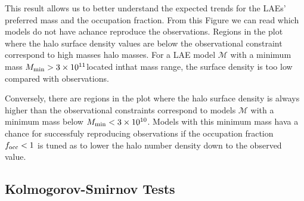 \documentclass[usenatbib]{mn2e}
\newcommand{\hMsun}{{\ifmmode{h^{-1}{\rm {M_{\odot}}}}\else{$h^{-1}{\rm{M_{\odot}}}$}\fi}}
\begin{document}
This result allows us to better understand the expected trends for the
LAEs' preferred mass and the occupation fraction.  From this Figure we
can read which models do not have achance reproduce the
observations. Regions in the plot where the halo surface density
values are below the observational constraint correspond to high
masses halo masses. For a LAE model ${\mathcal M}$ with a minimum mass
$M_{\rm   min}> 3 \times 10^{11}$\hMsun located inthat mass range, the
surface density is too low compared with observations.   

Conversely, there are regions in the plot where the halo surface
density is always higher than the observational constraints correspond
to models ${\mathcal M}$ with a minimum mass below $M_{\rm min}<
3\times 10^{10}$\hMsun. Models with this minimum mass hava a chance
for successfuly reproducing observations if the occupation fraction
$f_{\rm occ}<1$ is tuned as to lower the halo number density down to
the observed value.    

\subsection{Kolmogorov-Smirnov Tests}
\end{document}
